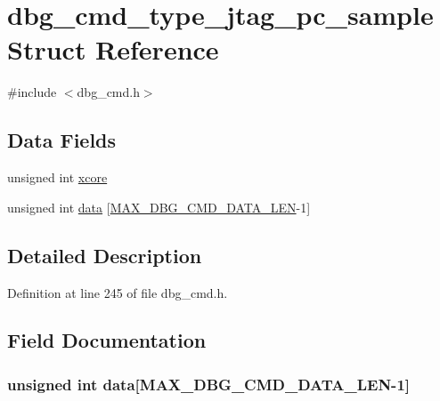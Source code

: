 \hypertarget{structdbg__cmd__type__jtag__pc__sample}{\section{dbg\-\_\-cmd\-\_\-type\-\_\-jtag\-\_\-pc\-\_\-sample Struct Reference}
\label{structdbg__cmd__type__jtag__pc__sample}
}


{\ttfamily \#include $<$dbg\-\_\-cmd.\-h$>$}

\subsection*{Data Fields}
\begin{DoxyCompactItemize}
\item 
unsigned int \hyperlink{structdbg__cmd__type__jtag__pc__sample_a78357326dd562d441c3c73f5676ac638}{xcore}
\item 
unsigned int \hyperlink{structdbg__cmd__type__jtag__pc__sample_abceed6826af53b88f4cc936fac1716f0}{data} \mbox{[}\hyperlink{dbg__cmd_8h_a4552ec15033c8a68870cdf80eda5470c}{M\-A\-X\-\_\-\-D\-B\-G\-\_\-\-C\-M\-D\-\_\-\-D\-A\-T\-A\-\_\-\-L\-E\-N}-\/1\mbox{]}
\end{DoxyCompactItemize}


\subsection{Detailed Description}


Definition at line 245 of file dbg\-\_\-cmd.\-h.



\subsection{Field Documentation}
\hypertarget{structdbg__cmd__type__jtag__pc__sample_abceed6826af53b88f4cc936fac1716f0}{
\subsubsection[{data}]{\setlength{\rightskip}{0pt plus 5cm}unsigned int data\mbox{[}{\bf M\-A\-X\-\_\-\-D\-B\-G\-\_\-\-C\-M\-D\-\_\-\-D\-A\-T\-A\-\_\-\-L\-E\-N}-\/1\mbox{]}}}\label{structdbg__cmd__type__jtag__pc__sample_abceed6826af53b88f4cc936fac1716f0}


